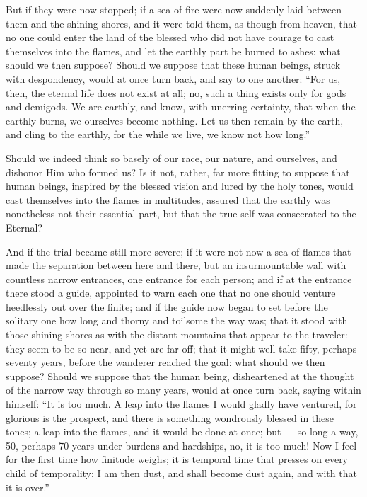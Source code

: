 \documentclass[12pt,a4paper]{book}
\begin{document}
But if they were now stopped; if a sea of fire were now suddenly laid between them and the shining shores, and it were told them, as though from heaven, that no one could enter the land of the blessed who did not have courage to cast themselves into the flames, and let the earthly part be burned to ashes: what should we then suppose? Should we suppose that these human beings, struck with despondency, would at once turn back, and say to one another: ``For us, then, the eternal life does not exist at all; no, such a thing exists only for gods and demigods. We are earthly, and know, with unerring certainty, that when the earthly burns, we ourselves become nothing. Let us then remain by the earth, and cling to the earthly, for the while we live, we know not how long.''

Should we indeed think so basely of our race, our nature, and ourselves, and dishonor Him who formed us? Is it not, rather, far more fitting to suppose that human beings, inspired by the blessed vision and lured by the holy tones, would cast themselves into the flames in multitudes, assured that the earthly was nonetheless not their essential part, but that the true self was consecrated to the Eternal?

And if the trial became still more severe; if it were not now a sea of flames that made the separation between here and there, but an insurmountable wall with countless narrow entrances, one entrance for each person; and if at the entrance there stood a guide, appointed to warn each one that no one should venture heedlessly out over the
finite; and if the guide now began to set before the solitary one how long and thorny and toilsome the way was; that it stood with those shining shores as with the distant mountains that appear to the traveler: they seem to be so near, and yet are far off; that it might well take fifty, perhaps seventy years, before the wanderer reached the goal: what should we then suppose? Should we suppose that the human being, disheartened at the thought of the narrow way through so many years, would at once turn back, saying within himself: ``It is too much. A leap into the flames I would gladly have ventured, for glorious is the prospect, and there is something wondrously blessed in these tones; a leap into the flames, and it would be done at once; but --- so long a way, 50, perhaps 70 years under burdens and hardships, no, it is too much! Now I feel for the first time how finitude weighs; it is temporal time that presses on every child of temporality: I am then dust, and shall become dust again, and with that it is over.''
\end{document}
